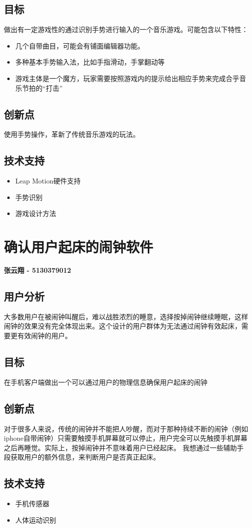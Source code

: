\documentclass{article} %
\begin{document}
\subsection{目标}
做出有一定游戏性的通过识别手势进行输入的一个音乐游戏。可能包含以下特性：
\begin{itemize}
  \item 几个自带曲目，可能会有铺面编辑器功能。
  \item 多种基本手势输入法，比如手指滑动，手掌翻动等
  \item 游戏主体是一个魔方，玩家需要按照游戏内的提示给出相应手势来完成合乎音乐节拍的“打击”
\end{itemize}
\begin{figure}[!h]
\begin{minipage}{0.5\linewidth}
  \caption{}\label{1-1}
\end{minipage}
\begin{minipage}{0.5\linewidth}
  \caption{}\label{1-2}
\end{minipage}
\end{figure}

\subsection{创新点}
使用手势操作，革新了传统音乐游戏的玩法。
\subsection{技术支持}
\begin{itemize}
  \item Leap Motion硬件支持
  \item 手势识别
  \item 游戏设计方法
\end{itemize}
\newpage
\section{确认用户起床的闹钟软件}
\textbf{张云翔 - 5130379012}
\subsection{用户分析}
大多数用户在被闹钟叫醒后，难以战胜浓烈的睡意，选择按掉闹钟继续睡眠，这样闹钟的效果没有完全体现出来。这个设计的用户群体为无法通过闹钟有效起床，需要更有效闹钟的用户。
\subsection{目标}
在手机客户端做出一个可以通过用户的物理信息确保用户起床的闹钟
\subsection{创新点}
对于很多人来说，传统的闹钟并不能把人吵醒，而对于那种持续不断的闹钟（例如iphone自带闹钟）只需要触摸手机屏幕就可以停止，用户完全可以先触摸手机屏幕之后再睡觉。实际上，按掉闹钟并不意味着用户已经起床。
我想通过一些辅助手段获取用户的额外信息，来判断用户是否真正起床。
\subsection{技术支持}
\begin{itemize}
  \item 手机传感器
  \item 人体运动识别
\end{itemize}
\end{document}
